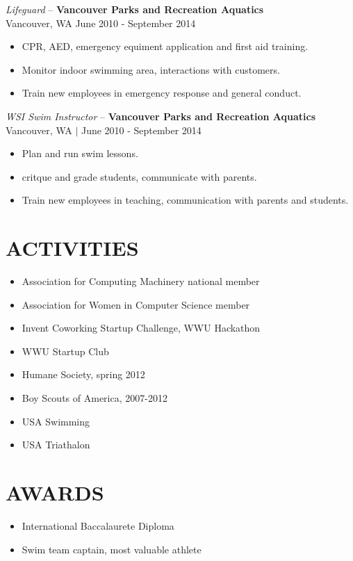 \documentclass[line,margin]{res}
\begin{document}
\begin{resume}
	{\sl Lifeguard} -- {\bf Vancouver Parks and Recreation Aquatics} \\
	{\footnotesize Vancouver, WA  June 2010 - September 2014}
	\begin{itemize} \itemsep -2pt
		\item CPR, AED, emergency equiment application and first aid training.
		\item Monitor indoor swimming area, interactions with customers.
		\item Train new employees in emergency response and general conduct.
	\end{itemize}

	{\sl WSI Swim Instructor} -- {\bf Vancouver Parks and Recreation Aquatics} \\
	{\footnotesize Vancouver, WA $|$  June 2010 - September 2014} \\
	\begin{itemize}  \itemsep -2pt
		\item Plan and run swim lessons.
		\item critque and grade students, communicate with parents.
		\item Train new employees in teaching, communication with parents and students.
	\end{itemize}

\section{ACTIVITIES} 
	\begin{itemize} \itemsep -3pt
	\item Association for Computing Machinery national member
	\item Association for Women in Computer Science member 
	\item Invent Coworking Startup Challenge, WWU Hackathon
	\item WWU Startup Club
	\item Humane Society, spring 2012
	\item Boy Scouts of America, 2007-2012
 	\item USA Swimming
	\item USA Triathalon
	\end{itemize}

\section{AWARDS}
	\begin{itemize} \itemsep -3pt
		\item International Baccalaurete Diploma
		\item Swim team captain, most valuable athlete 
	\end{itemize}

	
\end{resume}
\end{document}
